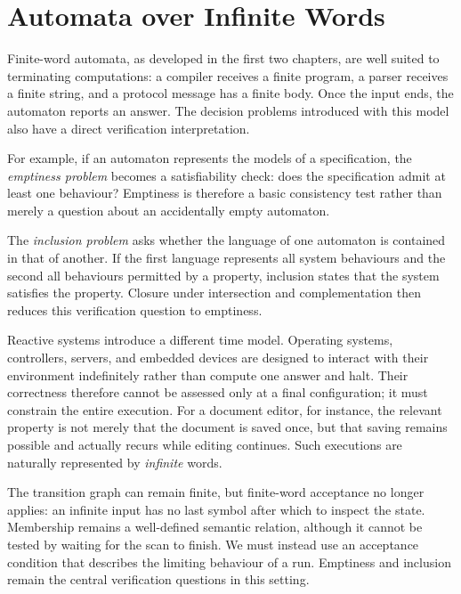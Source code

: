 
\chapter{Automata over Infinite Words}
\label{ch:omega-automata}


Finite-word automata, as developed in the first two chapters, are well
suited to terminating computations: a compiler receives a finite program,
a parser receives a finite string, and a protocol message has a finite
body.  Once the input ends, the automaton reports an answer.  The decision
problems introduced with this model also have a direct verification
interpretation.

For example, if an automaton represents the models of a specification,
the \emph{emptiness problem} becomes a satisfiability check: does the
specification admit at least one behaviour?  Emptiness is therefore a
basic consistency test rather than merely a question about an accidentally
empty automaton.

The \emph{inclusion problem} asks whether the language of one automaton is
contained in that of another.  If the first language represents all system
behaviours and the second all behaviours permitted by a property, inclusion
states that the system satisfies the property.  Closure under intersection
and complementation then reduces this verification question to emptiness.

Reactive systems introduce a different time model.  Operating systems,
controllers, servers, and embedded devices are designed to interact with
their environment indefinitely rather than compute one answer and halt.
Their correctness therefore cannot be assessed only at a final
configuration; it must constrain the entire execution.  For a document
editor, for instance, the relevant property is not merely that the document
is saved once, but that saving remains possible and actually recurs while
editing continues.  Such executions are naturally represented by
\emph{infinite} words.

The transition graph can remain finite, but finite-word acceptance no
longer applies: an infinite input has no last symbol after which to inspect
the state.  Membership remains a well-defined semantic relation, although
it cannot be tested by waiting for the scan to finish.  We must instead use
an acceptance condition that describes the limiting behaviour of a run.
Emptiness and inclusion remain the central verification questions in this
setting.

